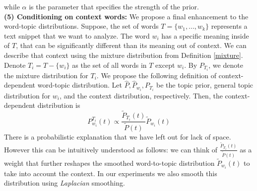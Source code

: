 \documentclass{article} %
\begin{document}
while $\alpha$ is the parameter that specifies the strength of the
prior.\\
{\bf (5) Conditioning on context words:} We propose a final enhancement to the word-topic
distributions. Suppose, the set of words $T=\{w_1,...,w_k\}$
represents a text snippet that we want to analyze. The word $w_i$ has
a specific meaning inside of $T$, that can be significantly different
than its meaning out of context. We can describe that context using
the mixture distribution from Definition \ref{mixture}. Denote
$T_i=T-\{w_i\}$ as the set of all words in $T$ except
$w_i$. By $P_{T_i}$, we denote the mixture distribution for $T_i$. We
propose the following definition of context-dependent word-topic
distribution. 
\bed
Let $\widehat{P},\widehat{P}_{w_i},P_{T_i}$ be the topic prior, general
topic distribution for $w_i$, and the context distribution,
respectively. Then, the context-dependent distribution is
\begin{equation*}
P^{T_i}_{w_i}(t)\propto \frac{\tilde{P}_{T_i}(t)}{\tilde{P}(t)}\tilde{P}_{w_i}(t)
\end{equation*}
\eed
There is a probabilistic explanation that we have left out for 
lack of space. However this can be intuitively understood as follows:
we can think of $\frac{\tilde{P}_{T_i}(t)}{\tilde{P}(t)}$ as a weight
that further reshapes the smoothed word-to-topic distribution $\tilde{P}_{w_i}(t)$
to take into account the context. In our experiments we also smooth this distribution
using {\em Laplacian} smoothing.
\end{document}
